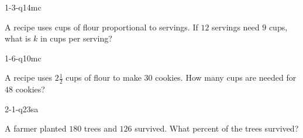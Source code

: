 \documentclass[12pt, fleqn, openany]{studyGuide}
\begin{document}
\renewcommand{\VMBookTitle}{7 Florida FAST Grade 7 Math Practice Tests}
\renewcommand{\VMBookSubtitle}{Comprehensive Test Prep with Detailed Answers}
\renewcommand{\VMFooterURL}{https://viewmath.com/grade7}
\renewcommand{\VMFooterURLDisplay}{ViewMath.com/Grade7}






\tableofcontents
\cleardoublepage
{}


\begin{practiceQuestion}{1-3-q14}{mc}
\begin{questionText}
A recipe uses cups of flour proportional to servings. If $12$ servings need $9$ cups, what is $k$ in cups per serving?
\end{questionText}
\end{practiceQuestion}

\begin{practiceQuestion}{1-6-q10}{mc}
\begin{questionText}
A recipe uses $2\frac{1}{2}$ cups of flour to make $30$ cookies. How many cups are needed for $48$ cookies?
\end{questionText}
\end{practiceQuestion}

\begin{practiceQuestion}{2-1-q23}{sa}
\begin{questionText}
A farmer planted $180$ trees and $126$ survived. What percent of the trees survived?
\end{questionText}
\end{practiceQuestion}
\end{document}

